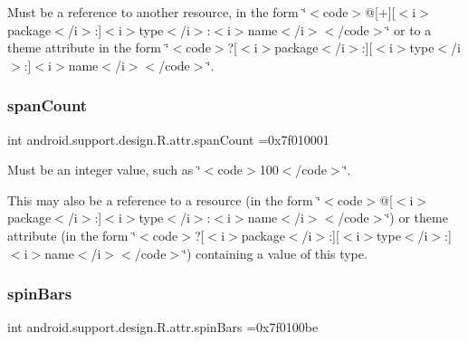 Must be a reference to another resource, in the form \char`\"{}$<$code$>$@\mbox{[}+\mbox{]}\mbox{[}$<$i$>$package$<$/i$>$\+:\mbox{]}$<$i$>$type$<$/i$>$\+:$<$i$>$name$<$/i$>$$<$/code$>$\char`\"{} or to a theme attribute in the form \char`\"{}$<$code$>$?\mbox{[}$<$i$>$package$<$/i$>$\+:\mbox{]}\mbox{[}$<$i$>$type$<$/i$>$\+:\mbox{]}$<$i$>$name$<$/i$>$$<$/code$>$\char`\"{}. \mbox{\label{classandroid_1_1support_1_1design_1_1R_1_1attr_a2b750d4992202f705352197b5671bc88}} 
\subsubsection{\texorpdfstring{span\+Count}{spanCount}}
{\footnotesize\ttfamily int android.\+support.\+design.\+R.\+attr.\+span\+Count =0x7f010001\hspace{0.3cm}{\ttfamily [static]}}

Must be an integer value, such as \char`\"{}$<$code$>$100$<$/code$>$\char`\"{}. 

This may also be a reference to a resource (in the form \char`\"{}$<$code$>$@\mbox{[}$<$i$>$package$<$/i$>$\+:\mbox{]}$<$i$>$type$<$/i$>$\+:$<$i$>$name$<$/i$>$$<$/code$>$\char`\"{}) or theme attribute (in the form \char`\"{}$<$code$>$?\mbox{[}$<$i$>$package$<$/i$>$\+:\mbox{]}\mbox{[}$<$i$>$type$<$/i$>$\+:\mbox{]}$<$i$>$name$<$/i$>$$<$/code$>$\char`\"{}) containing a value of this type. \mbox{\label{classandroid_1_1support_1_1design_1_1R_1_1attr_a8887867b280197a662e6b092f0ddcafe}} 
\subsubsection{\texorpdfstring{spin\+Bars}{spinBars}}
{\footnotesize\ttfamily int android.\+support.\+design.\+R.\+attr.\+spin\+Bars =0x7f0100be\hspace{0.3cm}{\ttfamily [static]}}

